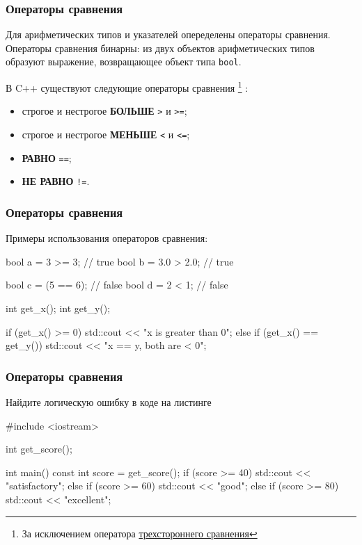 \documentclass[compress, 8pt]{beamer}
\begin{document}
\begin{frame}[fragile]

    \frametitle{Операторы сравнения}

    Для арифметических типов и указателей опеределены операторы сравнения.
    Операторы сравнения бинарны: из двух объектов арифметических типов образуют
    выражение, возвращающее объект типа \verb|bool|.

    \hfill\break
    В C++ существуют следующие операторы сравнения
    \footnote{За исключением оператора
        \href{https://en.cppreference.com/w/cpp/language/operator\_comparison}{трехстороннего сравнения}}
    :

    \begin{itemize}
        \item строгое и нестрогое \textbf{БОЛЬШЕ} \verb|>| и \verb|>=|;
        \item строгое и нестрогое \textbf{МЕНЬШЕ} \verb|<| и \verb|<=|;
        \item \textbf{РАВНО} \verb|==|;
        \item \textbf{НЕ РАВНО} \verb|!=|.
    \end{itemize}

\end{frame}

\begin{frame}[fragile]

    \frametitle{Операторы сравнения}

    Примеры использования операторов сравнения:

    \begin{myinplacelisting}[minted language=cpp]
bool a = 3 >= 3;    // true
bool b = 3.0 > 2.0; // true

bool c = (5 == 6);  // false
bool d = 2 < 1;     // false

int get_x();
int get_y();

if (get_x() >= 0) {
    std::cout << "x is greater than 0\n";
}
else if (get_x() == get_y()) {
    std::cout << "x == y, both are < 0\n";
}
    \end{myinplacelisting}

\end{frame}

\begin{frame}[fragile]

    \frametitle{Операторы сравнения}

    \begin{task}
        Найдите логическую ошибку в коде на листинге
    \end{task}

    \begin{myinplacelisting}[minted language=cpp]
#include <iostream>

int get_score();

int main() {
    const int score = get_score();
    if (score >= 40) {
        std::cout << "satisfactory\n";
    }
    else if (score >= 60) {
        std::cout << "good\n";
    }
    else if (score >= 80) {
        std::cout << "excellent\n";
    }
}
    \end{myinplacelisting}

\end{frame}
\end{document}
